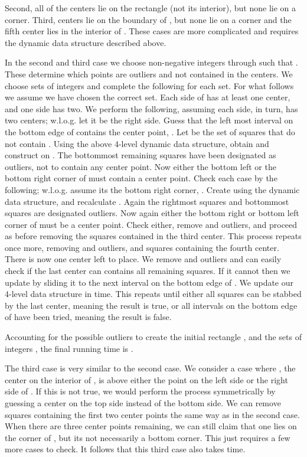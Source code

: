 \documentclass[11pt]{myclass}
\begin{document}
Second, all  of the centers lie on the rectangle  (not its interior), but none lie on a corner.  
Third,  centers lie on the boundary of , but none lie on a corner and the fifth center lies in the interior of .  
These cases are more complicated and requires the dynamic data structure described above.




In the second and third case we choose non-negative integers  through  such that .  These determine which points are outliers and not contained in the  centers.  We choose  sets of integers and complete the following for each set.  For what follows we assume we have chosen the correct set.  
Each side of  has at least one center, and one side has two.  We perform the following, assuming each side, in turn, has two centers; w.l.o.g. let it be the right side.
Guess that the left most interval on the bottom edge of  contains the center point, .  
Let  be the set of squares that do not contain .  Using the above 4-level dynamic data structure, obtain  and construct  on .  The bottommost  remaining squares have been designated as outliers, not to contain any center point.  
Now either the bottom left or the bottom right corner of  must contain a center point.  
Check each case by the following; w.l.o.g. assume its the bottom right corner, .  Create  using the dynamic data structure, and recalculate .  
Again the  rightmost squares and  bottommost squares are designated outliers.  
Now again either the bottom right or bottom left corner of  must be a center point.  Check either, remove  and  outliers, and proceed as before removing the squares contained in the third center.  
This process repeats once more, removing  and  outliers, and squares containing the fourth center.  There is now one center left to place.  We remove  and  outliers and can easily check if the last center can contains all remaining squares.  If it cannot then we update  by sliding it to the next interval on the bottom edge of .  We update our 4-level data structure in  time.  This repeats until either all squares can be stabbed by the last center, meaning the result is true, or all intervals on the bottom edge of  have been tried, meaning the result is false.  

Accounting for the  possible outliers to create the initial rectangle , and the  sets of integers , the final running time is .  

The third case is very similar to the second case.  We consider a case where , the center on the interior of , is above either the point on the left side or the right side of .  If this is not true, we would perform the process symmetrically by guessing a center on the top side instead of the bottom side.  We can remove squares containing the first two center points the same way as in the second case.  When there are three center points remaining, we can still claim that one lies on the corner of , but its not necessarily a bottom corner.  This just requires a few more cases to check.  It follows that this third case also takes  time.
\end{document}
